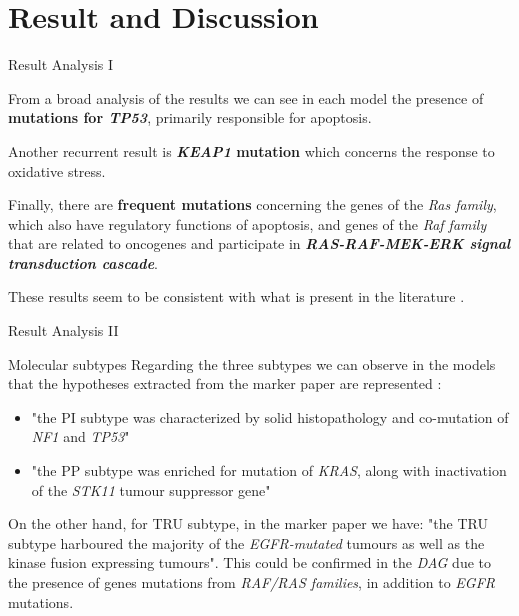 \documentclass{beamer}
\begin{document}
\section{Result and Discussion}
\begin{frame}{Result Analysis I}
    \begin{block}{}
        From a broad analysis of the results we can see in each model the presence of \textbf{mutations for \textit{TP53}}, primarily responsible for apoptosis.
    \end{block}
    \pause
    \begin{block}{}
        Another recurrent result is \textbf{\textit{KEAP1} mutation} which concerns the response to oxidative stress.
    \end{block}
    \pause
    \begin{block}{}
        Finally, there are \textbf{frequent mutations} concerning the genes of the \textit{Ras family}, which also have regulatory functions of apoptosis, and genes of the \textit{Raf family} that are related to oncogenes and participate in \textbf{\textit{RAS-RAF-MEK-ERK signal transduction cascade}}. 
    \end{block}
    \pause
    \begin{alertblock}{}
      These results seem to be consistent with what is present in the literature  \cite{rasl}.
    \end{alertblock}
\end{frame}
\begin{frame}{Result Analysis II}
    \begin{block}{Molecular subtypes}
      Regarding the three subtypes we can observe in the models that the hypotheses extracted from the marker paper are represented \cite{luadmarker}:
      \begin{itemize}
          \item "the PI subtype was characterized by solid histopathology and co-mutation of \textit{NF1} and \textit{TP53}"
          \item "the PP subtype was enriched for mutation of \textit{KRAS}, along with inactivation of the \textit{STK11} tumour suppressor gene"
      \end{itemize}
      On the other hand, for TRU subtype, in the marker paper we have: "the TRU subtype harboured the majority of the \textit{EGFR-mutated} tumours as well as the kinase fusion expressing tumours". This could be confirmed in the \textit{DAG} due to the presence of genes mutations from \textit{RAF/RAS families}, in addition to \textit{EGFR} mutations.
    \end{block}
\end{frame}
\end{document}
